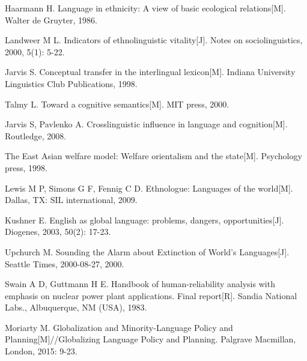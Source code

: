 \begin{thebibliography}{99}
	 Haarmann H. Language in ethnicity: A view of basic ecological relations[M]. Walter de Gruyter, 1986.
	
	 Landweer M L. Indicators of ethnolinguistic vitality[J]. Notes on sociolinguistics, 2000, 5(1): 5-22.
	
	 Jarvis S. Conceptual transfer in the interlingual lexicon[M]. Indiana University Linguistics Club Publications, 1998.
	
	 Talmy L. Toward a cognitive semantics[M]. MIT press, 2000.
	 
	 Jarvis S, Pavlenko A. Crosslinguistic influence in language and cognition[M]. Routledge, 2008.
	
	 The East Asian welfare model: Welfare orientalism and the state[M]. Psychology press, 1998.
	
	 Lewis M P, Simons G F, Fennig C D. Ethnologue: Languages of the world[M]. Dallas, TX: SIL international, 2009.
	
	 Kushner E. English as global language: problems, dangers, opportunities[J]. Diogenes, 2003, 50(2): 17-23.
	 
	 Upchurch M. Sounding the Alarm about Extinction of World's Languages[J]. Seattle Times, 2000-08-27, 2000.
	
	 Swain A D, Guttmann H E. Handbook of human-reliability analysis with emphasis on nuclear power plant applications. Final report[R]. Sandia National Labs., Albuquerque, NM (USA), 1983.
	 
	 Moriarty M. Globalization and Minority-Language Policy and Planning[M]//Globalizing Language Policy and Planning. Palgrave Macmillan, London, 2015: 9-23.
	
\end{thebibliography}